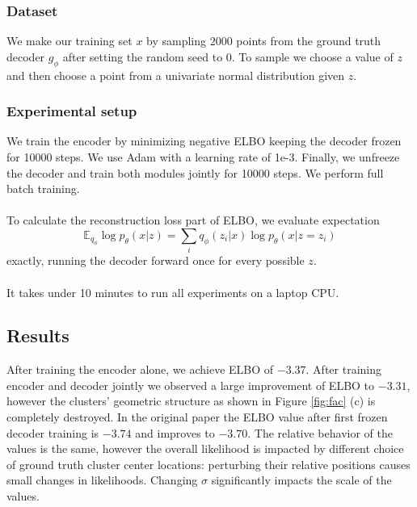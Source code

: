 \subsubsection{Dataset}
We make our training set $x$ by sampling $2000$ points from the ground truth decoder $g_\phi$ after setting the random seed to 0. To sample we choose a value of $z$ and then choose a point from a univariate normal distribution given $z$.


\subsubsection{Experimental setup}

We train the encoder by minimizing negative ELBO keeping the decoder frozen for 10000 steps. We use Adam with a learning rate of 1e-3. Finally, we unfreeze the decoder and train both modules jointly for 10000 steps. We perform full batch training.

\paragraph{} To calculate the reconstruction loss part of ELBO, we evaluate expectation  $$\mathbb{E}_{q_{\phi}}\log p_{\theta}(x|z) = \sum_i q_\phi(z_i|x) \log p_\theta(x|z = z_i)$$ exactly, running the decoder forward once for every possible $z$.

\paragraph{} It takes under 10 minutes to run all experiments on a laptop CPU.

\subsection{Results}
\label{sec:gmmresults}

After training the encoder alone, we achieve ELBO of $-3.37$. After training encoder and decoder jointly we observed a large improvement of ELBO to $-3.31$, however the clusters' geometric structure as shown in Figure \ref{fig:fac} (c) is completely destroyed. In the original paper the ELBO value after first frozen decoder training is $-3.74$ and improves to $-3.70$. The relative behavior of the values is the same, however the overall likelihood is impacted by different choice of ground truth cluster center locations: perturbing their relative positions causes small changes in likelihoods. Changing $\sigma$ significantly impacts the scale of the values.

